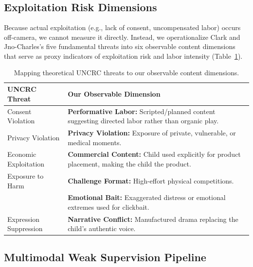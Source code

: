 \documentclass[letterpaper]{article} %
\begin{document}
\subsection{Exploitation Risk Dimensions}

Because actual exploitation (e.g., lack of consent, uncompensated labor) occurs off-camera, we cannot measure it directly. Instead, we operationalize Clark and Jno-Charles's \citep{clark2025child} five fundamental threats into six observable content dimensions that serve as proxy indicators of exploitation risk and labor intensity (Table~\ref{tab:mapping}).

\begin{table}[h!]
\centering
\small
\begin{tabular}{p{2.5cm} p{5cm}}
\toprule
\textbf{UNCRC Threat \citep{clark2025child}} & \textbf{Our Observable Dimension} \\
\midrule
Consent Violation & \textbf{Performative Labor:} Scripted/planned content suggesting directed labor rather than organic play. \\
Privacy Violation & \textbf{Privacy Violation:} Exposure of private, vulnerable, or medical moments. \\
Economic Exploitation & \textbf{Commercial Content:} Child used explicitly for product placement, making the child the product. \\
Exposure to Harm & \textbf{Challenge Format:} High-effort physical competitions.\\
& \textbf{Emotional Bait:} Exaggerated distress or emotional extremes used for clickbait. \\
Expression Suppression & \textbf{Narrative Conflict:} Manufactured drama replacing the child's authentic voice. \\
\bottomrule
\end{tabular}
\caption{Mapping theoretical UNCRC threats to our observable content dimensions.}
\label{tab:mapping}
\end{table}

\subsection{Multimodal Weak Supervision Pipeline}
\end{document}
